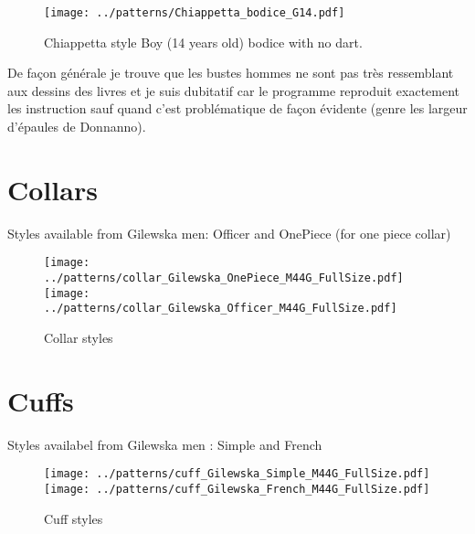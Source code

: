 \documentclass[11pt,a4paper]{article}
\begin{document}
\begin{figure}[hbtp]
\centering
\texttt{[image: ../patterns/Chiappetta\_bodice\_G14.pdf]}
\caption{Chiappetta style Boy (14 years old) bodice with no dart.}
\label{fig:CB14}
\end{figure}

De façon générale je trouve que les bustes hommes ne sont pas très ressemblant aux dessins des livres et je suis dubitatif car le programme reproduit exactement les instruction sauf quand c'est problématique de façon évidente (genre les largeur d'épaules de Donnanno).


\section{Collars}
Styles available from Gilewska men: Officer and OnePiece (for one piece collar)

\begin{figure}
\begin{center}
\texttt{[image: ../patterns/collar\_Gilewska\_OnePiece\_M44G\_FullSize.pdf]} 
\texttt{[image: ../patterns/collar\_Gilewska\_Officer\_M44G\_FullSize.pdf]} 
\end{center}
\caption{Collar styles}
\end{figure}


\section{Cuffs}
Styles availabel from Gilewska men : Simple and French

\begin{figure}
\begin{center}
\texttt{[image: ../patterns/cuff\_Gilewska\_Simple\_M44G\_FullSize.pdf]} 
\texttt{[image: ../patterns/cuff\_Gilewska\_French\_M44G\_FullSize.pdf]} 
\end{center}
\caption{Cuff styles}
\end{figure}





\end{document}
